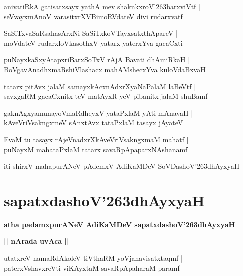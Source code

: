 \documentclass[twoside,12pt,openright]{book}
\def\S{\char'263}
\newcounter{shloka}[chapter]
\def\uvaca#1{\centerline{{\large\textbf{#1}}}}
\begin{document}
\begin{shloka}
anivatiRkA gatisatxsayx yathA mev shaknkxroV\S barxviVtf |\\
seVvayxmAnoV varasitxrXVBimoRVdateV divi rudarxvatf
\end{shloka}

\begin{shloka}
SaSiTxvaSaRsahasArxNi SaSiTxkoVTayxsatxthApareV |\\
moVdateV rudarxloVkasothxV yatarx yaterxYva gacaCxti 
\end{shloka}

\begin{shloka}
puNayxkaSxyAtapxriBarxSoTxV rAjA Bavati dhAmiRkaH |\\
BoVgavAnadhxmaRshiVlashacx mahAMshecxYva kuloVdaBxvaH 
\end{shloka}

\begin{shloka}
tatarx pitAvx jalaM samayxkAcxnAdxrXyaNaPalaM laBeVtf |\\
savxgaRM gacaCxnitx teV matAyxR yeV pibanitx jalaM shuBamf
\end{shloka}

\begin{shloka}
gaknAgxyamunayoVmaRdheyxV yataPxlaM yAti mAnavaH |\\
kAveVriVsakngxmeV sAnxtAvx tataPxlaM tasayx jAyateV 
\end{shloka}

\begin{shloka}
EvaM tu tasayx rAjeVnadxrXkAveVriVsakngxmaM mahatf |\\
puNayxM mahataPxlaM tatarx savaRpApaparxNAshanamf
\end{shloka}

\begin{center}
iti shirxV mahapurANeV pAdemxV AdiKaMDeV SoVDashoV\S dhAyxyaH
\end{center}

\chapter{sapatxdashoV\S dhAyxyaH}

\begin{center}
{\LARGE\bfseries atha padamxpurANeV AdiKaMDeV sapatxdashoV\S dhAyxyaH}
\end{center}

\uvaca{|| nArada uvAca ||}

\begin{shloka}
utatxreV namaRdAkoleV tiVthaRM yoVjanavisatxtaqmf |\\
paterxVshavxreVti viKAyxtaM savaRpApaharaM paramf
\end{shloka}
\end{document}
